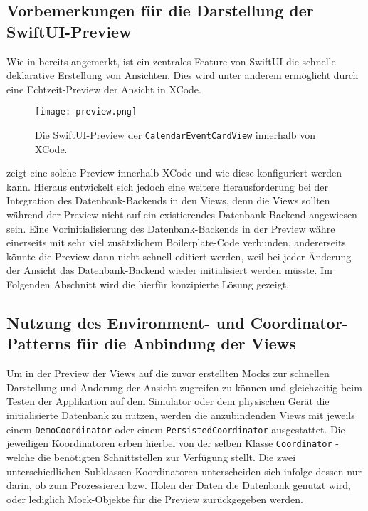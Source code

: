 \subsection{Vorbemerkungen für die Darstellung der SwiftUI-Preview}

Wie in  bereits angemerkt, ist ein zentrales Feature von SwiftUI die schnelle deklarative Erstellung von Ansichten. Dies wird unter anderem ermöglicht durch eine Echtzeit-Preview der Ansicht in XCode.

\begin{figure}[H]
\texttt{[image: preview.png]}
\caption{Die SwiftUI-Preview der \texttt{CalendarEventCardView} innerhalb von XCode.}\label{fig:preview}
\end{figure}

\noindent {} zeigt eine solche Preview innerhalb XCode und wie diese konfiguriert werden kann. Hieraus entwickelt sich jedoch eine weitere Herausforderung bei der Integration des Datenbank-Backends in den Views, denn die Views sollten während der Preview nicht auf ein existierendes Datenbank-Backend angewiesen sein. Eine Vorinitialisierung des Datenbank-Backends in der Preview währe einerseits mit sehr viel zusätzlichem Boilerplate-Code verbunden, andererseits könnte die Preview dann nicht schnell editiert werden, weil bei jeder Änderung der Ansicht das Datenbank-Backend wieder initialisiert werden müsste. Im Folgenden Abschnitt wird die hierfür konzipierte Lösung gezeigt.

\subsection{Nutzung des Environment- und Coordinator-Patterns für die Anbindung der Views}

Um in der Preview der Views auf die zuvor erstellten Mocks zur schnellen Darstellung und Änderung der Ansicht zugreifen zu können und gleichzeitig beim Testen der Applikation auf dem Simulator oder dem physischen Gerät die initialisierte Datenbank zu nutzen, werden die anzubindenden Views mit jeweils einem \texttt{DemoCoordinator} oder einem \texttt{PersistedCoordinator} ausgestattet. Die jeweiligen Koordinatoren erben hierbei von der selben Klasse \texttt{Coordinator} - welche die benötigten Schnittstellen zur Verfügung stellt. Die zwei unterschiedlichen Subklassen-Koordinatoren unterscheiden sich infolge dessen nur darin, ob zum Prozessieren bzw. Holen der Daten die Datenbank genutzt wird, oder lediglich Mock-Objekte für die Preview zurückgegeben werden.


